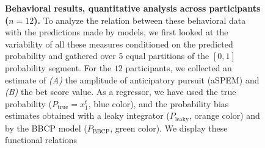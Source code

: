 \documentclass[10pt,letterpaper]{article}
\newcommand{\seeFig}[1]{Figure~\ref{fig:#1}}
\newcommand{\Rone}[1]{\textbf{\textcolor{magenta}{[rev 1: #1]}}}
\begin{document}
\begin{figure}%
\caption{%
\textbf{Behavioral results, quantitative analysis across participants ($n=12$).} %
To analyze the relation between these behavioral data with the predictions made by models,
we first looked at the variability of all these measures
conditioned on the predicted probability and
gathered over 5 equal partitions of the $[0, 1]$ probability segment.
For the $12$ participants, we collected an estimate of
\textit{(A)} the amplitude of anticipatory pursuit (aSPEM)
and \textit{(B)} the bet score value.
As a regressor, we have used the true probability ($P_{\text{true}}=x_1^t$, blue color),
and the probability bias estimates obtained with a leaky integrator ($P_{\text{leaky}}$, orange color)
and by the BBCP model ($P_{\text{BBCP}}$, green color).
We display these functional relations
}
\end{figure}
\end{document}
